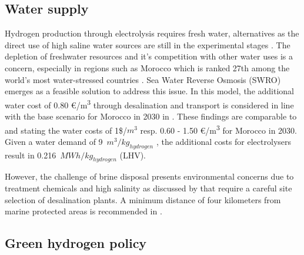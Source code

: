 \subsection{Water supply}
\label{subsec:water_supply}
Hydrogen production through electrolysis requires fresh water, alternatives as the direct use of high saline water sources are still in the experimental stages \cite{Tong2020}. The depletion of freshwater resources and it's competition with other water uses is a concern, especially in regions such as Morocco which is ranked 27th among the world's most water-stressed countries \cite{Maddocks2015}. 
Sea Water Reverse Osmosis (SWRO) emerges as a feasible solution to address this issue. In this model, the additional water cost of 0.80 €/\si{\cubic\metre} through desalination and transport is considered in line with the base scenario for Morocco in 2030 in \cite{Caldera2020}. These findings are comparable to \cite{Kettani2020} and \cite{Caldera2016} stating the water costs of 1\$/$m^3$ resp. 0.60 - 1.50 €/\si{\cubic\metre} for Morocco in 2030. Given a water demand of 9~$m^3/kg_{hydrogen}$
\cite{Hampp2023}, the additional costs for electrolysers result in 0.216~$MWh/kg_{hydrogen}$ (LHV).

However, the challenge of brine disposal presents environmental concerns due to treatment chemicals and high salinity as discussed by \cite{Thomann2022, Dresp2019, Tonelli2023} that require a careful site selection of desalination plants. A minimum distance of four kilometers from marine protected areas is recommended in \cite{Thomann2022}.


\subsection{Green hydrogen policy}
\label{subsec:green_hydrogen_constraint}

